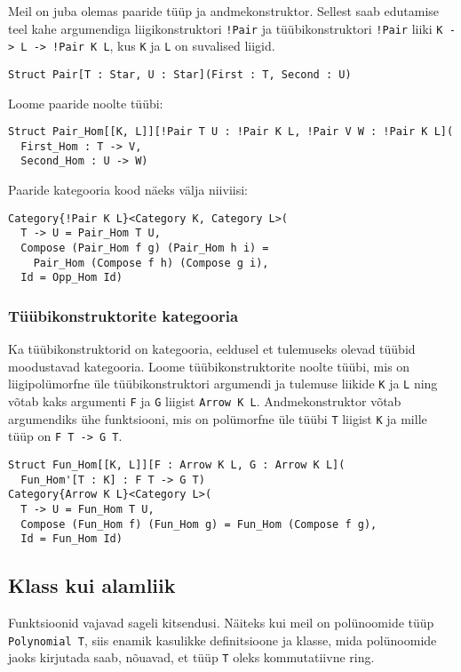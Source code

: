 \documentclass[12pt]{article}
\begin{document}
        Meil on juba olemas paaride tüüp ja andmekonstruktor. Sellest saab edutamise teel kahe argumendiga liigikonstruktori \verb"!Pair" ja tüübikonstruktori \verb"!Pair" liiki \verb"K -> L -> !Pair K L", kus \verb!K! ja \verb!L! on suvalised liigid.

        \begin{verbatim}Struct Pair[T : Star, U : Star](First : T, Second : U)\end{verbatim}

        Loome paaride noolte tüübi:

        \begin{verbatim}Struct Pair_Hom[[K, L]][!Pair T U : !Pair K L, !Pair V W : !Pair K L](
  First_Hom : T -> V,
  Second_Hom : U -> W)\end{verbatim}

        Paaride kategooria kood näeks välja niiviisi:

        \begin{verbatim}Category{!Pair K L}<Category K, Category L>(
  T -> U = Pair_Hom T U,
  Compose (Pair_Hom f g) (Pair_Hom h i) =
    Pair_Hom (Compose f h) (Compose g i),
  Id = Opp_Hom Id)\end{verbatim}
      \subsubsection{Tüübikonstruktorite kategooria}
        Ka tüübikonstruktorid on kategooria, eeldusel et tulemuseks olevad tüübid moodustavad kategooria. Loome tüübikonstruktorite noolte tüübi, mis on liigipolümorfne üle tüübikonstruktori argumendi ja tulemuse liikide \verb!K! ja \verb!L! ning võtab kaks argumenti \verb!F! ja \verb!G! liigist \verb!Arrow K L!. Andmekonstruktor võtab argumendiks ühe funktsiooni, mis on polümorfne üle tüübi \verb!T! liigist \verb!K! ja mille tüüp on \verb!F T -> G T!.

        \begin{verbatim}Struct Fun_Hom[[K, L]][F : Arrow K L, G : Arrow K L](
  Fun_Hom'[T : K] : F T -> G T)
Category{Arrow K L}<Category L>(
  T -> U = Fun_Hom T U,
  Compose (Fun_Hom f) (Fun_Hom g) = Fun_Hom (Compose f g),
  Id = Fun_Hom Id)\end{verbatim}
    \subsection{Klass kui alamliik}
      Funktsioonid vajavad sageli kitsendusi. Näiteks kui meil on polünoomide tüüp \verb!Polynomial T!, siis enamik kasulikke definitsioone ja klasse, mida polünoomide jaoks kirjutada saab, nõuavad, et tüüp \verb!T! oleks kommutatiivne ring.
\end{document}
